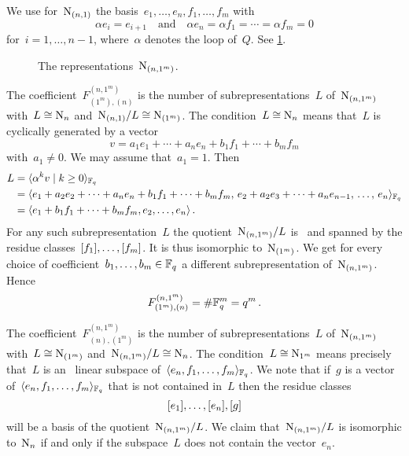 \documentclass[a4paper,11pt]{scrartcl}
\begin{document}
We use for~$\mathrm{N}_{(n,1)}$ the basis~$e_1, \dotsc, e_n, f_1, \dotsc, f_m$ with
\[
  \alpha e_i = e_{i+1}
  \quad\text{and}\quad
  \alpha e_n = \alpha f_1 = \dotsb = \alpha f_m = 0
\]
for~$i = 1, \dotsc, n-1$, where~$\alpha$ denotes the loop of~$Q$.
See \cref{basis for n 1}.
\begin{figure}[tb]
  \centering
    \caption{The representations~$\mathrm{N}_{(n, 1^m)}$.}
  \label{basis for n 1}
\end{figure}

The coefficient~$F^{(n, 1^m)}_{(1^m), (n)}$ is the number of subrepresentations~$L$ of~$\mathrm{N}_{(n, 1^m)}$ with~$L \cong \mathrm{N}_n$ and~$\mathrm{N}_{(n,1)} / L \cong \mathrm{N}_{(1^m)}$.
The condition~$L \cong \mathrm{N}_n$ means that~$L$ is cyclically generated by a vector
\[
  v
  =
  a_1 e_1 + \dotsb + a_n e_n
  + b_1 f_1 + \dotsb + b_m f_m
\]
with~$a_1 \neq 0$.
We may assume that~$a_1 = 1$.
Then
\begin{align*}
  L
  &=
  \gen{ \alpha^k v \suchthat k \geq 0 }_{\Finite_q}
  \\
  &=
  \gen{
    e_1 + a_2 e_2 + \dotsb + a_n e_n
    + b_1 f_1 + \dotsb + b_m f_m,
    \,
    e_2 + a_2 e_3 + \dotsb + a_n e_{n-1},
    \,
    \dotsc,
    \,
    e_n
  }_{\Finite_q}
  \\
  &=
  \gen{ e_1 + b_1 f_1 + \dotsb + b_m f_m, e_2, \dotsc, e_n } \,.
\end{align*}
For any such subrepresentation~$L$ the quotient~$\mathrm{N}_{(n, 1^m)} / L$ is~ and spanned by the residue classes~$[f_1], \dotsc, [f_m]$.
It is thus isomorphic to~$\mathrm{N}_{(1^m)}$.
We get for every choice of coefficient~$b_1, \dotsc, b_m \in \mathbb{F}_q$ a different subrepresentation of~$\mathrm{N}_{(n, 1^m)}$.
Hence
\[
  F^{(n, 1^m)}_{(1^m), (n)}
  =
  \# \mathbb{F}_q^m
  =
  q^m \,.
\]

The coefficient~$F^{(n, 1^m)}_{(n), (1^m)}$ is the number of subrepresentations~$L$ of~$\mathrm{N}_{(n, 1^m)}$ with~$L \cong \mathrm{N}_{(1^m)}$ and~$\mathrm{N}_{(n, 1^m)}/L \cong \mathrm{N}_n$.
The condition~$L \cong \mathrm{N}_{1^m}$ means precisely that~$L$ is an~ linear subspace of~$\langle e_n, f_1, \dotsc, f_m \rangle_{\mathbb{F}_q}$.
We note that if~$g$ is a vector of~$\langle e_n, f_1, \dotsc, f_m \rangle_{\mathbb{F}_q}$ that is not contained in~$L$ then the residue classes
\[
  [e_1], \dotsc, [e_n], [g]
\]
will be a basis of the quotient~$\mathrm{N}_{(n, 1^m)} / L$.
We claim that~$\mathrm{N}_{(n, 1^m)} / L$ is isomorphic to~$\mathrm{N}_n$ if and only if the subspace~$L$ does not contain the vector~$e_n$.
\end{document}
